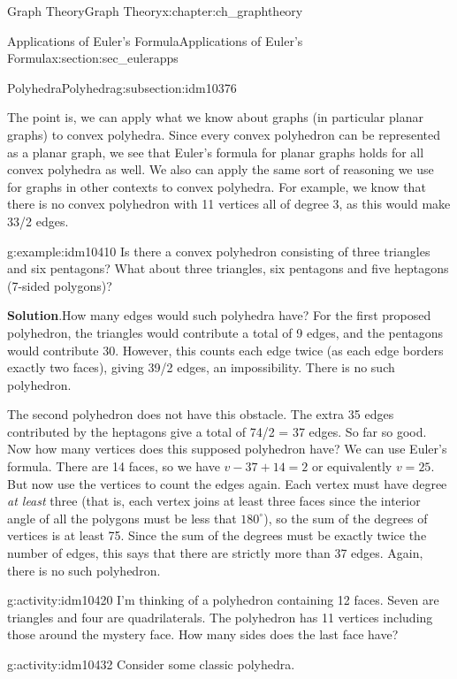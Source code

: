 \documentclass[oneside,10pt,]{book}
\numberwithin{equation}{chapter}
\begin{document}
\begin{chapterptx}{Graph Theory}{}{Graph Theory}{}{}{x:chapter:ch_graphtheory}
\begin{sectionptx}{Applications of Euler's Formula}{}{Applications of Euler's Formula}{}{}{x:section:sec_eulerapps}
\begin{subsectionptx}{Polyhedra}{}{Polyhedra}{}{}{g:subsection:idm10376}
\par
The point is, we can apply what we know about graphs (in particular planar graphs) to convex polyhedra. Since every convex polyhedron can be represented as a planar graph, we see that Euler's formula for planar graphs holds for all convex polyhedra as well. We also can apply the same sort of reasoning we use for graphs in other contexts to convex polyhedra. For example, we know that there is no convex polyhedron with 11 vertices all of degree 3, as this would make 33\slash{}2 edges.%
\begin{example}{}{g:example:idm10410}%
Is there a convex polyhedron consisting of three triangles and six pentagons? What about three triangles, six pentagons and five heptagons (7-sided polygons)?%
\par\smallskip%
\noindent\textbf{Solution}.\hypertarget{g:solution:idm10413}{}\quad{}How many edges would such polyhedra have? For the first proposed polyhedron, the triangles would contribute a total of 9 edges, and the pentagons would contribute 30. However, this counts each edge twice (as each edge borders exactly two faces), giving 39\slash{}2 edges, an impossibility. There is no such polyhedron.%
\par
The second polyhedron does not have this obstacle. The extra 35 edges contributed by the heptagons give a total of 74\slash{}2 = 37 edges. So far so good. Now how many vertices does this supposed polyhedron have? We can use Euler's formula. There are 14 faces, so we have \(v - 37 + 14 = 2\) or equivalently \(v = 25\). But now use the vertices to count the edges again. Each vertex must have degree \emph{at least} three (that is, each vertex joins at least three faces since the interior angle of all the polygons must be less that \(180^\circ\)), so the sum of the degrees of vertices is at least 75. Since the sum of the degrees must be exactly twice the number of edges, this says that there are strictly more than 37 edges. Again, there is no such polyhedron.%
\end{example}
\begin{activity}{}{g:activity:idm10420}%
I'm thinking of a polyhedron containing 12 faces. Seven are triangles and four are quadrilaterals. The polyhedron has 11 vertices including those around the mystery face. How many sides does the last face have?%
\end{activity}
\begin{activity}{}{g:activity:idm10432}%
Consider some classic polyhedra.%
\begin{enumerate}[font=\bfseries,label=(\alph*),ref=\alph*]

\end{enumerate}
\end{activity}
\end{subsectionptx}
\end{sectionptx}
\end{chapterptx}
\end{document}
